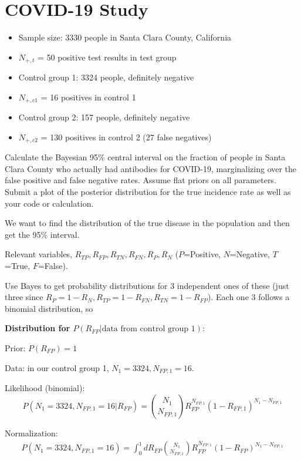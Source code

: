 \section{COVID-19 Study}
\begin{itemize}
    \item Sample size: 3330 people in Santa Clara County, California
    \item $N_{+,t}$ = 50 positive test results in test group
    \item Control group 1: 3324 people, definitely negative
    \item $N_{+,c1}$ = 16 positives in control 1
    \item Control group 2: 157 people, definitely negative
    \item $N_{+,c2}$ = 130 positives in control 2 (27 false negatives)
\end{itemize}

Calculate the Bayesian 95\% central interval on the fraction of people in Santa Clara County who actually had antibodies for COVID-19, marginalizing over the false positive and false negative rates. Assume flat priors on all parameters. Submit a plot of the posterior distribution for the true incidence rate as well as your code or calculation.

\vspace{1cm}

We want to find the distribution of the true disease in the population and then get the 95\% interval.

Relevant variables, $R_{TP}, R_{FP}, R_{TN}, R_{FN}, R_P, R_N$ ($P$=Positive, $N$=Negative, $T$=True, $F$=False).

Use Bayes to get probability distributions for 3 independent ones of these (just three since $R_P = 1 - R_N, R_{TP} = 1 - R_{FN}, R_{TN} = 1 - R_{FP}$). Each one 3 follows a binomial distribution, so

\textbf{Distribution for $P(R_{FP}|\text{data from control group 1})$}:

Prior: $P(R_{FP}) = 1$

Data: in our control group 1, $N_1 = 3324, N_{FP,1} = 16$.

Likelihood (binomial): $$P(N_1=3324, N_{FP,1}=16 | R_{FP}) = {N_1 \choose N_{FP,1}} R_{FP}^{N_{FP,1}} (1-R_{FP,1})^{N_1-N_{FP,1}}$$

Normalization:
\begin{align*}
    P(N_1=3324, N_{FP,1}=16) = \int_0^1 dR_{FP} {N_1 \choose N_{FP,1}} R_{FP}^{N_{FP,1}} (1-R_{FP})^{N_1-N_{FP,1}} \\
\end{align*}


